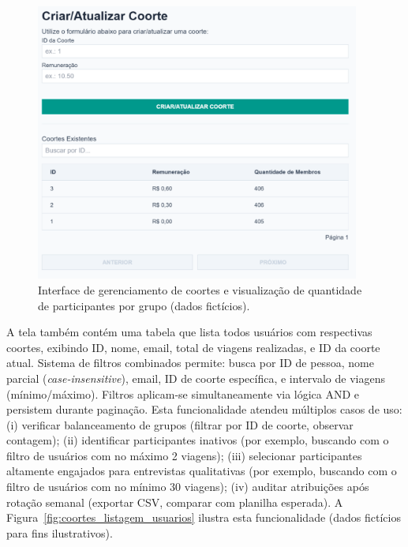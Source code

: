  \begin{figure}[htb]
   \centering
   \includegraphics[width=0.95\textwidth]{figuras/coortes.PNG}
   \caption{Interface de gerenciamento de coortes e visualização de quantidade de participantes por grupo (dados fictícios).}
   \label{fig:coortes_listagem}
 \end{figure}

 A tela também contém uma tabela que lista todos usuários com respectivas coortes, exibindo ID, nome, email, total de viagens realizadas, e ID da coorte atual. Sistema de filtros combinados permite: busca por ID de pessoa, nome parcial (\textit{case-insensitive}), email, ID de coorte específica, e intervalo de viagens (mínimo/máximo). Filtros aplicam-se simultaneamente via lógica AND e persistem durante paginação. Esta funcionalidade atendeu múltiplos casos de uso: (i) verificar balanceamento de grupos (filtrar por ID de coorte, observar contagem); (ii) identificar participantes inativos (por exemplo, buscando com o filtro de usuários com no máximo 2 viagens); (iii) selecionar participantes altamente engajados para entrevistas qualitativas (por exemplo, buscando com o filtro de usuários com no mínimo 30 viagens); (iv) auditar atribuições após rotação semanal (exportar CSV, comparar com planilha esperada). A Figura~\ref{fig:coortes_listagem_usuarios} ilustra esta funcionalidade (dados fictícios para fins ilustrativos).


